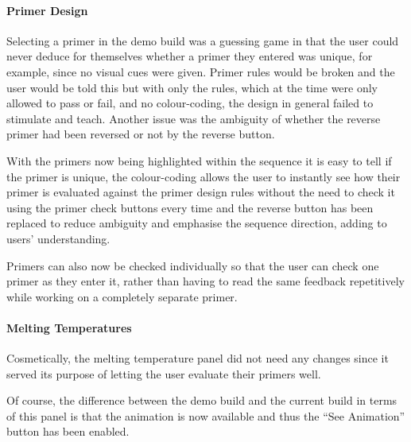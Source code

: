 \paragraph{Primer Design}
Selecting a primer in the demo build was a guessing game in that the
user could never deduce for themselves whether a primer they entered
was unique, for example, since no visual cues were given.
Primer rules would be broken and the user would be told this but with
only the rules, which at the time were only allowed to pass or fail,
and no colour-coding, the design in general failed to stimulate and
teach.
Another issue was the ambiguity of whether the reverse primer had been
reversed or not by the reverse button.

With the primers now being highlighted within the sequence it is easy
to tell if the primer is unique, the colour-coding allows the user to
instantly see how their primer is evaluated against the primer design
rules without the need to check it using the primer check buttons
every time and the reverse button has been replaced to reduce
ambiguity and emphasise the sequence direction, adding to users'
understanding. 

Primers can also now be checked individually so that the user can
check one primer as they enter it, rather than having to read the same
feedback repetitively while working on a completely separate primer.

\paragraph{Melting Temperatures}
Cosmetically, the melting temperature panel did not need any changes
since it served its purpose of letting the user evaluate their primers
well.

Of course, the difference between the demo build and the current build
in terms of this panel is that the animation is now available and thus
the ``See Animation'' button has been enabled.

